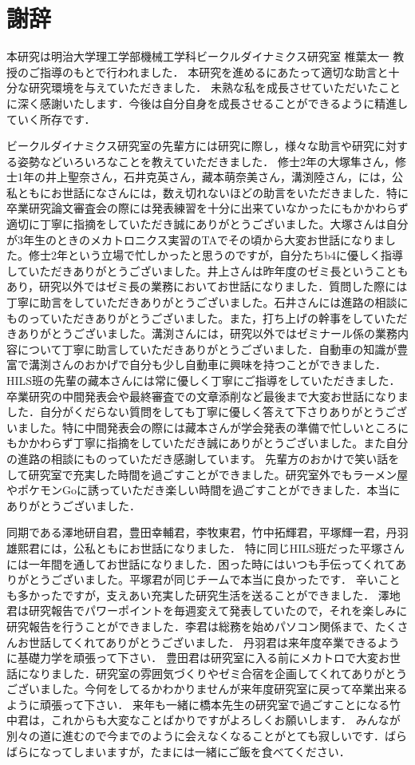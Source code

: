 \documentclass[a4paper,12pt]{article_vdlab_sotsuron}
\begin{document}
\section*{謝辞}
本研究は明治大学理工学部機械工学科ビークルダイナミクス研究室 椎葉太一 教授のご指導のもとで行われました．
本研究を進めるにあたって適切な助言と十分な研究環境を与えていただきました．
未熟な私を成長させていただいたことに深く感謝いたします．今後は自分自身を成長させることができるように精進していく所存です．

ビークルダイナミクス研究室の先輩方には研究に際し，様々な助言や研究に対する姿勢などいろいろなことを教えていただきました．
修士2年の大塚隼さん，修士1年の井上聖奈さん，石井克英さん，藏本萌奈美さん，溝渕陸さん，には，公私ともにお世話になさんには，数え切れないほどの助言をいただきました．特に卒業研究論文審査会の際には発表練習を十分に出来ていなかったにもかかわらず適切に丁寧に指摘をしていただき誠にありがとうございました。大塚さんは自分が3年生のときのメカトロニクス実習のTAでその頃から大変お世話になりました。修士2年という立場で忙しかったと思うのですが，自分たちb4に優しく指導していただきありがとうございました。井上さんは昨年度のゼミ長ということもあり，研究以外ではゼミ長の業務においてお世話になりました．質問した際には丁寧に助言をしていただきありがとうございました。石井さんには進路の相談にものっていただきありがとうございました。また，打ち上げの幹事をしていただきありがとうございました。溝渕さんには，研究以外ではゼミナール係の業務内容について丁寧に助言していただきありがとうございました．自動車の知識が豊富で溝渕さんのおかげで自分も少し自動車に興味を持つことができました．HILS班の先輩の藏本さんには常に優しく丁寧にご指導をしていただきました．卒業研究の中間発表会や最終審査での文章添削など最後まで大変お世話になりました．自分がくだらない質問をしても丁寧に優しく答えて下さりありがとうございました。特に中間発表会の際には藏本さんが学会発表の準備で忙しいところにもかかわらず丁寧に指摘をしていただき誠にありがとうございました。また自分の進路の相談にものっていただき感謝しています。
先輩方のおかけで笑い話をして研究室で充実した時間を過ごすことができました。研究室外でもラーメン屋やポケモンGoに誘っていただき楽しい時間を過ごすことができました．本当にありがとうございました．

同期である澤地研自君，豊田幸輔君，李牧東君，竹中拓輝君，平塚輝一君，丹羽雄熙君には，公私ともにお世話になりました．
特に同じHILS班だった平塚さんには一年間を通してお世話になりました．困った時にはいつも手伝ってくれてありがとうございました。平塚君が同じチームで本当に良かったです．
辛いことも多かったですが，支えあい充実した研究生活を送ることができました．
澤地君は研究報告でパワーポイントを毎週変えて発表していたので，それを楽しみに研究報告を行うことができました．李君は総務を始めパソコン関係まで、たくさんお世話してくれてありがとうございました．
丹羽君は来年度卒業できるように基礎力学を頑張って下さい．
豊田君は研究室に入る前にメカトロで大変お世話になりました．研究室の雰囲気づくりやゼミ合宿を企画してくれてありがとうございました。今何をしてるかわかりませんが来年度研究室に戻って卒業出来るように頑張って下さい．
来年も一緒に橋本先生の研究室で過ごすことになる竹中君は，これからも大変なことばかりですがよろしくお願いします．
みんなが別々の道に進むので今までのように会えなくなることがとても寂しいです．ばらばらになってしまいますが，たまには一緒にご飯を食べてください．
\end{document}
